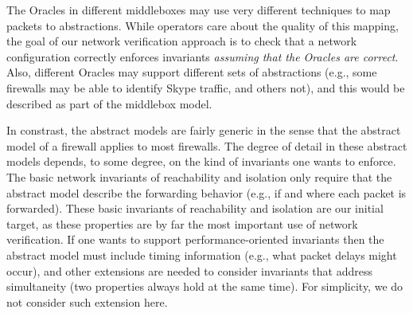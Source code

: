 The Oracles in different middleboxes may use very different techniques to map packets to abstractions. While operators care about the quality of this mapping, the goal of our network verification approach is to check that a network configuration correctly enforces invariants {\em assuming that the Oracles are correct}. Also, different Oracles may  support different sets of abstractions (e.g., some firewalls may be able to identify Skype traffic, and others not), and this would be described as part of the middlebox model.

In constrast, the abstract models are fairly generic in the sense that the abstract model of a firewall applies to most firewalls. The degree of detail in these abstract models depends, to some degree, on the kind of invariants one wants to enforce.  The basic network invariants of reachability and isolation only require that the abstract model describe the forwarding behavior (e.g., if and where each packet is forwarded). These basic invariants of reachability and isolation are our initial target, as these properties are by far the most important use of network verification. If one wants to support performance-oriented invariants then the abstract model must include timing information (e.g., what packet delays might occur), and other extensions are needed to consider invariants that address simultaneity (two properties always hold at the same time). For simplicity, we do not consider such extension here.

